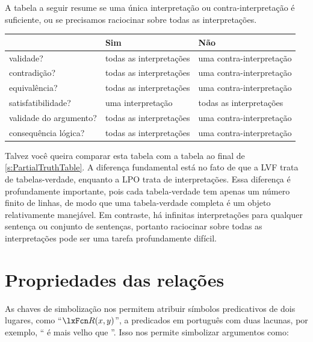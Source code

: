 A tabela a seguir resume se uma única interpretação ou contra-interpretação é suficiente, ou se precisamos raciocinar sobre todas as interpretações.

\begin{center}\small
\begin{tabular}{l l l}
 & \textbf{Sim} & \textbf{Não}\\
 \hline
validade? & todas as interpretações & uma contra-interpretação\\
contradição? & todas as interpretações & uma contra-interpretação\\
equivalência? & todas as interpretações & uma contra-interpretação\\
satisfatibilidade? & uma interpretação & todas as interpretações\\
validade do argumento? & todas as interpretações & uma contra-interpretação\\
consequência lógica? & todas as interpretações & uma contra-interpretação\\
\end{tabular}
\end{center}
\label{table.ModelOrArgument}

Talvez você queira comparar esta tabela com a tabela ao final de \cref{s:PartialTruthTable}. A diferença fundamental está no fato de que a LVF trata de tabelas-verdade, enquanto a LPO trata de interpretações. Essa diferença é profundamente importante, pois cada tabela-verdade tem apenas um número finito de linhas, de modo que uma tabela-verdade completa é um objeto relativamente manejável. Em contraste, há infinitas interpretações para qualquer sentença ou conjunto de sentenças, portanto raciocinar sobre todas as interpretações pode ser uma tarefa profundamente difícil.

\chapter{Propriedades das relações}\label{ch:PropRelations}

As chaves de simbolização nos permitem atribuir símbolos predicativos de dois lugares, como \textquotedblleft $\atom{R}{x,y}$\textquotedblright{}, a predicados em português com duas lacunas, por exemplo, \textquotedblleft {} é mais velho que \textquotedblright{}. Isso nos permite simbolizar argumentos como:



